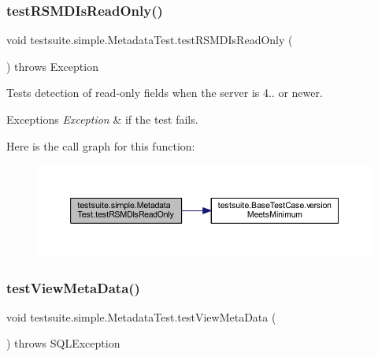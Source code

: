 \subsubsection{\texorpdfstring{test\+R\+S\+M\+D\+Is\+Read\+Only()}{testRSMDIsReadOnly()}}
{\footnotesize\ttfamily void testsuite.\+simple.\+Metadata\+Test.\+test\+R\+S\+M\+D\+Is\+Read\+Only (\begin{DoxyParamCaption}{ }\end{DoxyParamCaption}) throws Exception}

Tests detection of read-\/only fields when the server is 4.. or newer.


\begin{DoxyExceptions}{Exceptions}
{\em Exception} & if the test fails. \\
\hline
\end{DoxyExceptions}
Here is the call graph for this function\+:
\nopagebreak
\begin{figure}[H]
\begin{center}
\leavevmode
\includegraphics[width=350pt]{classtestsuite_1_1simple_1_1_metadata_test_a64f47fc5191272bd0bcf14cf6370480b_cgraph}
\end{center}
\end{figure}
\mbox{\label{classtestsuite_1_1simple_1_1_metadata_test_a57723e10153ca42cc7eac867f896d662}} 
\subsubsection{\texorpdfstring{test\+View\+Meta\+Data()}{testViewMetaData()}}
{\footnotesize\ttfamily void testsuite.\+simple.\+Metadata\+Test.\+test\+View\+Meta\+Data (\begin{DoxyParamCaption}{ }\end{DoxyParamCaption}) throws S\+Q\+L\+Exception}

